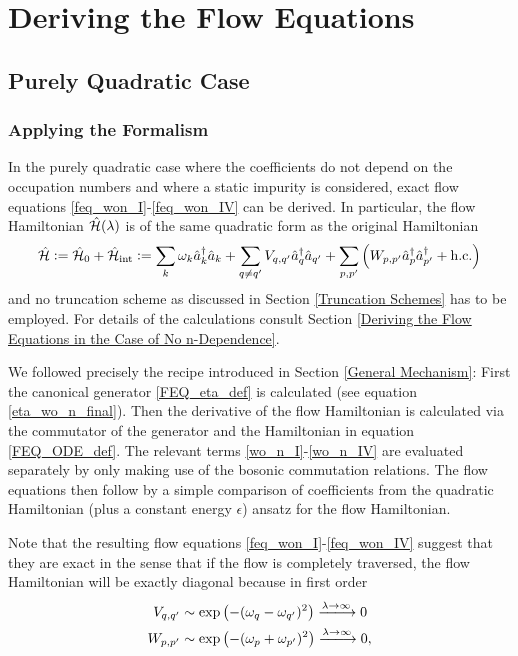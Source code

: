 \chapter{Deriving the Flow Equations}\label{Determining the Flow Equations}
\section{Purely Quadratic Case}
\subsection{Applying the Formalism}
In the purely quadratic case where the coefficients do not depend on the occupation numbers and where a static impurity is considered, exact flow equations \ref{feq_won_I}-\ref{feq_won_IV} can be derived. In particular, the flow Hamiltonian $\hat{\mathcal{H}}(\lambda)$ is of the same quadratic form as the original Hamiltonian
\begin{equation}\label{def_purely_quadratic_hamiltonian}
\hat{\mathcal{H}} \vcentcolon= \hat{\mathcal{H}}_0+\hat{\mathcal{H}}_{\mathrm{int}} \vcentcolon= \sum\limits_k \omega_k \hat a^\dagger_k\hat a_k+\sum\limits_{q\neq q^\prime}V_{q,q^\prime}\hat a^\dagger_q\hat a_{q^\prime}+\sum\limits_{p,p^\prime}\left(W_{p,p^\prime}\hat a^\dagger_p\hat a^\dagger_{p^\prime}+\mathrm{h.c.}\right)
\end{equation}
 and no truncation scheme as discussed in Section \ref{Truncation Schemes} has to be employed. For details of the calculations consult Section \ref{Deriving the Flow Equations in the Case of No n-Dependence}.\par 
We followed precisely the recipe introduced in Section \ref{General Mechanism}: First the canonical generator \ref{FEQ_eta_def} is calculated (see equation \ref{eta_wo_n_final}). Then the derivative of the flow Hamiltonian is calculated via the commutator of the generator and the Hamiltonian in equation \ref{FEQ_ODE_def}. The relevant terms \ref{wo_n_I}-\ref{wo_n_IV} are evaluated separately by only making use of the bosonic commutation relations. The flow equations then follow by a simple comparison of coefficients from the quadratic Hamiltonian (plus a constant energy $\epsilon$) ansatz for the flow Hamiltonian.\par
Note that the resulting flow equations \ref{feq_won_I}-\ref{feq_won_IV} suggest that they are exact in the sense that if the flow is completely traversed, the flow Hamiltonian will be exactly diagonal because in first order
\begin{subequations}
\begin{align}
V_{q,q^\prime}&\sim \exp\left(-(\omega_q-\omega_{q^\prime})^2\right)\xlongrightarrow{\lambda\rightarrow\infty}0\\
W_{p,p^\prime}&\sim \exp\left(-(\omega_p+\omega_{p^\prime})^2\right)\xlongrightarrow{\lambda\rightarrow\infty}0,
\end{align}
\end{subequations}

